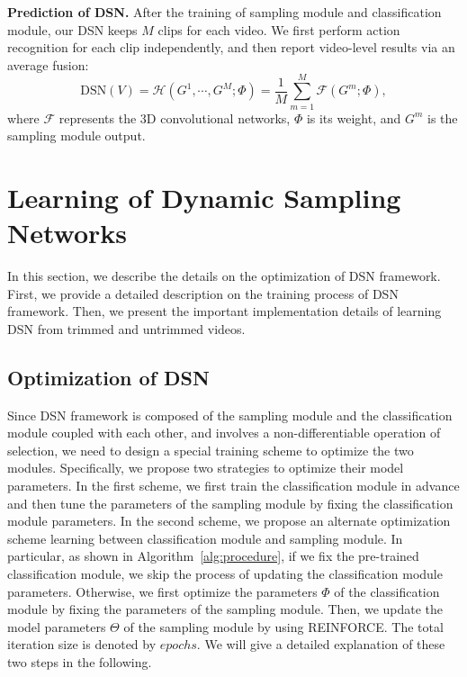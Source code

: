 \documentclass[journal]{IEEEtran}
\begin{document}
{\bf Prediction of DSN.} After the training of sampling module and classification module, our DSN keeps $M$ clips for each video. We first perform action recognition for each clip independently, and then report video-level results via an average fusion:
\begin{equation}
    \mathrm{DSN} (V) = \mathcal{H}(G^1,\cdots,G^M; \Phi) = \frac{1}{M}\sum_{m=1}^M \mathcal{F}(G^m;\Phi),
\label{avg}
\end{equation}
where $\mathcal{F}$ represents the 3D convolutional networks, $\Phi$ is its weight, and $G^m$ is the sampling module output.

\section{Learning of Dynamic Sampling Networks}
\label{sec:optimization}
In this section, we describe the details on the optimization of DSN framework.
First, we provide a detailed description on the training process of DSN framework.
Then, we present the important implementation details of learning DSN from trimmed and untrimmed videos.

\subsection{Optimization of DSN}

Since DSN framework is composed of the sampling module and the classification module coupled with each other, and involves a non-differentiable operation of selection, we need to design a special training scheme to optimize the two modules.
Specifically, we propose two strategies to optimize their model parameters. In the first scheme, we first train the classification module in advance and then tune the parameters of the sampling module by fixing the classification module parameters.
In the second scheme, we propose an alternate optimization scheme learning between classification module and sampling module.
In particular, as shown in Algorithm~\ref{alg:procedure}, if we fix the pre-trained classification module, we skip the process of updating the classification module parameters.
Otherwise, we first optimize the parameters $\Phi$ of the classification module by fixing the parameters of the sampling module.
Then, we update the model parameters $\Theta$ of the sampling module by using REINFORCE. The total iteration size is denoted by $epochs$.
We will give a detailed explanation of these two steps in the following.
\end{document}
